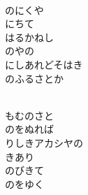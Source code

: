 \documentclass[10pt,b5j]{tarticle} %
\begin{document}
\vspace{1.5em} %
\newcommand{\linespace}{0.5em} %
\newcommand{\blocksize}{0.5\hsize} %
\newcommand{\itemmargin}{3em} %
\begin{enumerate} %
    \setlength{\itemindent}{\itemmargin} %
    \begin{minipage}[c]{\blocksize}
    
        \vspace{\linespace}
        \item~\\
        のにくや\\
        にちて\\
        はるかねし\\
        のやの\\
        にしあれどそはき\\
        のふるさとか
        
    \end{minipage}
    \begin{minipage}[c]{\blocksize}
        
        \vspace{\linespace}
        \item~\\
        もむのさと\\
        のをぬれば\\
        りしきアカシヤの\\
        きあり\\
        のびきて\\
        のをゆく
        
    \end{minipage}
    \begin{minipage}[c]{\blocksize}
        

\end{minipage}
\end{enumerate}
\end{document}
